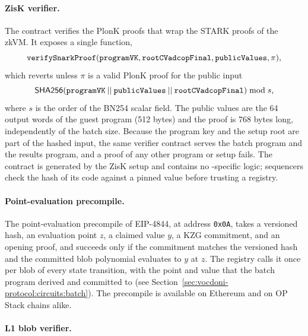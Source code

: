 \paragraph{ZisK verifier.}

The \hlset{\ziskverifier} contract verifies the PlonK proofs that wrap the \ac{STARK} proofs of the \ac{zkVM}. It exposes a single function,
\[ \texttt{verifySnarkProof}(\texttt{programVK}, \texttt{rootCVadcopFinal}, \texttt{publicValues}, \pi), \]
which reverts unless $\pi$ is a valid PlonK proof for the public input
\[ {\sf{SHA256}}(\texttt{programVK} \:||\: \texttt{publicValues} \:||\: \texttt{rootCVadcopFinal}) \bmod s, \]
where $s$ is the order of the BN254 scalar field. The public values are the 64 output words of the guest program (512 bytes) and the proof is 768 bytes long, independently of the batch size. Because the program key and the setup root are part of the hashed input, the same verifier contract serves the batch program and the results program, and a proof of any other program or setup fails. The contract is generated by the ZisK setup and contains no \davinci-specific logic; sequencers check the hash of its code against a pinned value before trusting a registry.

\paragraph{Point-evaluation precompile.}

The point-evaluation precompile of EIP-4844, at address \texttt{0x0A}, takes a versioned hash, an evaluation point $z$, a claimed value $y$, a \ac{KZG} commitment, and an opening proof, and succeeds only if the commitment matches the versioned hash and the committed blob polynomial evaluates to $y$ at $z$. The registry calls it once per blob of every state transition, with the point and value that the batch program derived and committed to (see Section~\ref{sec:vocdoni-protocol:circuits:batch}). The precompile is available on Ethereum and on OP Stack chains alike.

\paragraph{L1 blob verifier.}

